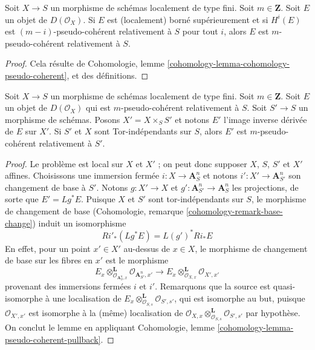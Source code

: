 \begin{lemma}
\label{lemma-cohomology-relative-pseudo-coherent}
Soit $X \to S$ un morphisme de schémas localement de type fini.
Soit $m \in \mathbf{Z}$. Soit $E$ un objet de $D(\mathcal{O}_X)$.
Si $E$ est (localement) borné supérieurement et si $H^i(E)$ est $(m - i)$-pseudo-cohérent
relativement à $S$ pour tout $i$, alors $E$ est $m$-pseudo-cohérent relativement à $S$.
\end{lemma}

\begin{proof}
Cela résulte de
Cohomologie, lemme \ref{cohomology-lemma-cohomology-pseudo-coherent},
et des définitions.
\end{proof}

\begin{lemma}
\label{lemma-base-change-relative-pseudo-coherent}
Soit $X \to S$ un morphisme de schémas localement de type fini.
Soit $m \in \mathbf{Z}$. Soit $E$ un objet de $D(\mathcal{O}_X)$
qui est $m$-pseudo-cohérent relativement à $S$. Soit $S' \to S$ un
morphisme de schémas. Posons $X' = X \times_S S'$ et notons $E'$
l'image inverse dérivée de $E$ sur $X'$. Si $S'$ et $X$ sont
Tor-indépendants sur $S$, alors $E'$
est $m$-pseudo-cohérent relativement à $S'$.
\end{lemma}

\begin{proof}
Le problème est local sur $X$ et $X'$ ; on peut donc supposer $X$, $S$, $S'$ et
$X'$ affines. Choisissons une immersion fermée $i : X \to \mathbf{A}^n_S$
et notons $i' : X' \to \mathbf{A}^n_{S'}$ son changement de base à $S'$.
Notons $g : X' \to X$ et $g' : \mathbf{A}^n_{S'} \to \mathbf{A}^n_S$
les projections, de sorte que $E' = Lg^*E$. Puisque $X$ et $S'$ sont tor-indépendants
sur $S$, le morphisme de changement de base
(Cohomologie, remarque \ref{cohomology-remark-base-change})
induit un isomorphisme
$$
Ri'_*(Lg^*E) = L(g')^*Ri_*E
$$
En effet, pour un point $x' \in X'$ au-dessus de $x \in X$, le morphisme de changement de base
sur les fibres en $x'$ est le morphisme
$$
E_x \otimes_{\mathcal{O}_{\mathbf{A}^n_S, x}}^\mathbf{L}
\mathcal{O}_{\mathbf{A}^n_{S'}, x'}
\longrightarrow
E_x \otimes_{\mathcal{O}_{X, x}}^\mathbf{L}
\mathcal{O}_{X', x'}
$$
provenant des immersions fermées $i$ et $i'$. Remarquons que la source
est quasi-isomorphe à une localisation de
$E_x \otimes_{\mathcal{O}_{S, s}}^\mathbf{L} \mathcal{O}_{S', s'}$,
qui est isomorphe au but, puisque
$\mathcal{O}_{X', x'}$ est isomorphe à la (même) localisation de
$\mathcal{O}_{X, x} \otimes_{\mathcal{O}_{S, s}}^\mathbf{L}
\mathcal{O}_{S', s'}$ par hypothèse. On conclut le lemme
en appliquant
Cohomologie, lemme \ref{cohomology-lemma-pseudo-coherent-pullback}.
\end{proof}

